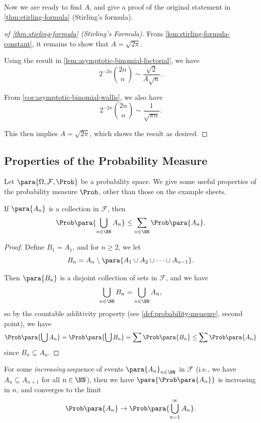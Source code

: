 Now we are ready to find \(A\), and give a proof of the original statement in \autoref{thm:stirling-formula} (Stirling's formula).

\begin{proof}[of \autoref{thm:stirling-formula} (Stirling's Formula)]
    From \autoref{lem:stirling-formula-constant}, it remains to show that \(A = \sqrt{2 \pi}\).
    
    Using the result in \autoref{lem:asymptotic-binomial-factorial}, we have
    \[
        2^{-2n} \binom{2n}{n} \sim \frac{\sqrt{2}}{A \sqrt{n}}.
    \]

    From \autoref{cor:asymptotic-binomial-wallis}, we also have
    \[
        2^{-2n} \binom{2n}{n} \sim \frac{1}{\sqrt{\pi n}}.
    \]
    
    This then implies \(A = \sqrt{2 \pi}\), which shows the result as desired.
\end{proof}

\subsection{Properties of the Probability Measure}

Let \(\para{\Omega, \mathcal{F}, \Prob}\) be a probability space. We give some useful properties of the probability measure \(\Prob\), other than those on the example sheets.

\begin{proposition}
    \label{prop:countable-subadditivity}%
    If \(\para{A_n}\) is a collection in \(\mathcal{F}\), then
    \[
        \Prob\para{\bigcup_{n \in \NN} A_n} \leq \sum_{n \in \NN} \Prob\para{A_n}.
    \]
\end{proposition}

\begin{proof}
    Define \(B_1 = A_1\), and for \(n \geq 2\), we let
    \[
        B_n = A_n \setminus \para{A_1 \cup A_2 \cup \cdots \cup A_{n - 1}}.
    \]

    Then \(\para{B_n}\) is a disjoint collection of sets in \(\mathcal{F}\), and we have
    \[
        \bigcup_{n \in \NN} B_n = \bigcup_{n \in \NN} A_n,
    \]
    so by the countable additivity property (see \autoref{def:probability-measure}, second point), we have
    \[
        \Prob\para{\bigcup A_n} = \Prob\para{\bigcup B_n} = \sum \Prob\para{B_n} \leq \sum \Prob\para{A_n}
    \]
    since \(B_n \subseteq A_n\).
\end{proof}

\begin{proposition}
    \label{prop:continuity-of-probability-measure}%
    For some \emph{increasing} sequence of events \(\para{A_n}_{n \in \NN}\) in \(\mathcal{F}\) (i.e., we have \(A_n \subseteq A_{n + 1}\) for all \(n \in \NN\)), then we have \(\para{\Prob\para{A_n}}\) is increasing in \(n\), and converges to the limit
    \[
        \Prob\para{A_n} \to \Prob\para{\bigcup_{n = 1}^{\infty} A_n}.
    \]
\end{proposition}


